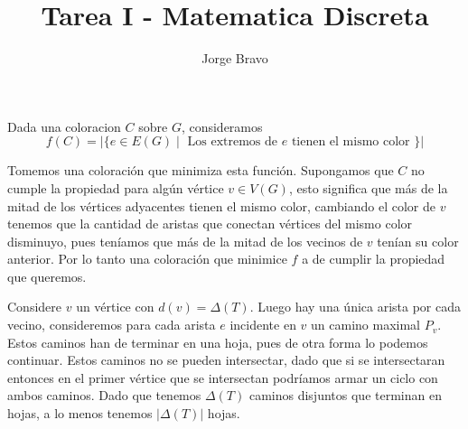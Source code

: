 \documentclass[a4paper,oneside,10.5pt]{USMArt}
\title{Tarea I - Matematica Discreta}
\author{Jorge Bravo}
\begin{document}
\maketitle

\begin{sol}
  Dada una coloracion $C$ sobre $G$, consideramos
  \begin{equation*}
    f(C) = |\{ e \in E(G) \; | \; \text{ Los extremos de } e \text{ tienen el mismo color }\}|
  \end{equation*}

  Tomemos una coloración que minimiza esta función. Supongamos que $C$ no cumple la propiedad para algún vértice
  $v \in V(G)$, esto significa que m\'as de la mitad de los vértices adyacentes tienen el mismo color, cambiando
  el color de $v$ tenemos que la cantidad de aristas que conectan vértices del mismo color disminuyo, pues teníamos
  que m\'as de la mitad de los vecinos de $v$ tenían su color anterior. Por lo tanto una coloración que minimice
  $f$ a de cumplir la propiedad que queremos.
\end{sol}

\begin{sol}
  Considere $v$ un vértice con $d(v) = \Delta(T)$. Luego hay una única arista por cada vecino, consideremos para cada
  arista $e$ incidente en $v$ un camino maximal $P_{v}$. Estos caminos han de terminar en una hoja, pues de
  otra forma lo podemos continuar. Estos caminos no se pueden intersectar, dado que si se intersectaran entonces en el primer vértice
  que se intersectan podríamos armar un ciclo con ambos caminos. Dado que tenemos $\Delta(T)$ caminos disjuntos que terminan en hojas,
  a lo menos tenemos $|\Delta(T)|$ hojas.
\end{sol}
\end{document}
